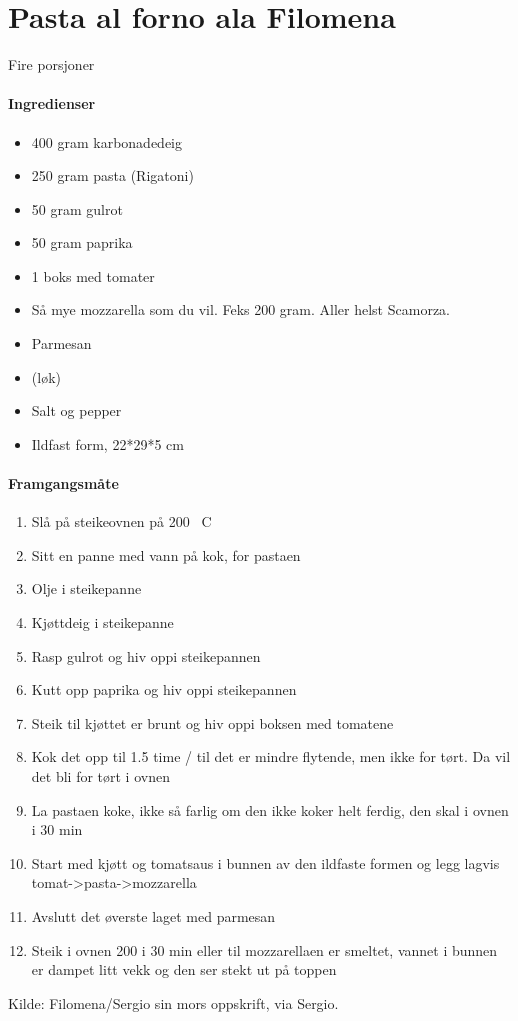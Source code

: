 \section{﻿Pasta al forno ala Filomena}

Fire porsjoner

\paragraph{Ingredienser}
\begin{itemize}[noitemsep]
  \item 400 gram karbonadedeig
  \item 250 gram pasta (Rigatoni)
  \item 50 gram gulrot
  \item 50 gram paprika
  \item 1 boks med tomater
  \item Så mye mozzarella som du vil. Feks 200 gram. Aller helst Scamorza.
  \item Parmesan
  \item (løk)
  \item Salt og pepper
  \item Ildfast form, 22*29*5 cm
\end{itemize}

\paragraph{Framgangsmåte}
\begin{enumerate}[noitemsep]
  \item Slå på steikeovnen på 200 \degree~C
  \item Sitt en panne med vann på kok, for pastaen
  \item Olje i steikepanne
  \item Kjøttdeig i steikepanne
  \item Rasp gulrot og hiv oppi steikepannen
  \item Kutt opp paprika og hiv oppi steikepannen
  \item Steik til kjøttet er brunt og hiv oppi boksen med tomatene
  \item Kok det opp til 1.5 time / til det er mindre flytende, men ikke for tørt. Da vil det bli for tørt i ovnen
  \item La pastaen koke, ikke så farlig om den ikke koker helt ferdig, den skal i ovnen i 30 min
  \item Start med kjøtt og tomatsaus i bunnen av den ildfaste formen og legg lagvis tomat->pasta->mozzarella
  \item Avslutt det øverste laget med parmesan
  \item Steik i ovnen 200 i 30 min eller til mozzarellaen er smeltet, vannet i bunnen er dampet litt vekk og den ser stekt ut på toppen
\end{enumerate}


Kilde: Filomena/Sergio sin mors oppskrift, via Sergio.
